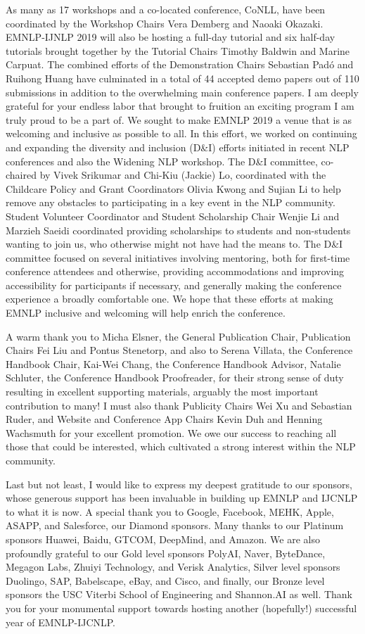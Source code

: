 As many as 17 workshops and a co-located conference, CoNLL, have been coordinated by the Workshop Chairs Vera Demberg and Naoaki Okazaki. EMNLP-IJNLP 2019 will also be hosting a full-day tutorial and six half-day tutorials brought together by the Tutorial Chairs Timothy Baldwin and Marine Carpuat. The combined efforts of the Demonstration Chairs Sebastian Padó and Ruihong Huang have culminated in a total of 44 accepted demo papers out of 110 submissions in addition to the overwhelming main conference papers. I am deeply grateful for your endless labor that brought to fruition an exciting program I am truly proud to be a part of. 
We sought to make EMNLP 2019 a venue that is as welcoming and inclusive as possible to all. In this effort, we worked on continuing and expanding the diversity and inclusion (D\&I) efforts initiated in recent NLP conferences and also the Widening NLP workshop.  The D\&I committee, co-chaired by Vivek Srikumar and Chi-Kiu (Jackie) Lo, coordinated with the Childcare Policy and Grant Coordinators Olivia Kwong and Sujian Li to help remove any obstacles to participating in a key event in the NLP community. Student Volunteer Coordinator and Student Scholarship Chair Wenjie Li and Marzieh Saeidi coordinated providing scholarships to students and non-students wanting to join us, who otherwise might not have had the means to. The D\&I committee focused on several initiatives involving mentoring, both for first-time conference attendees and otherwise, providing accommodations and improving accessibility for participants if necessary, and generally making the conference experience a broadly comfortable one. We hope that these efforts at making EMNLP inclusive and welcoming will help enrich the conference.

A warm thank you to Micha Elsner, the General Publication Chair, Publication Chairs Fei Liu and Pontus Stenetorp, and also to Serena Villata, the Conference Handbook Chair, Kai-Wei Chang, the Conference Handbook Advisor, Natalie Schluter, the Conference Handbook Proofreader, for their strong sense of duty resulting in excellent supporting materials, arguably the most important contribution to many! I must also thank Publicity Chairs Wei Xu and Sebastian Ruder, and Website and Conference App Chairs Kevin Duh and Henning Wachsmuth for your excellent promotion. We owe our success to reaching all those that could be interested, which cultivated a strong interest within the NLP community.

Last but not least, I would like to express my deepest gratitude to our sponsors, whose generous support has been invaluable in building up EMNLP and IJCNLP to what it is now. A special thank you to Google, Facebook, MEHK, Apple, ASAPP, and Salesforce, our Diamond sponsors. Many thanks to our Platinum sponsors Huawei, Baidu, GTCOM, DeepMind, and Amazon. We are also profoundly grateful to our Gold level sponsors PolyAI, Naver, ByteDance, Megagon Labs, Zhuiyi Technology, and Verisk Analytics, Silver level sponsors Duolingo, SAP, Babelscape, eBay, and Cisco, and finally, our Bronze level sponsors the USC Viterbi School of Engineering and Shannon.AI as well. 
Thank you for your monumental support towards hosting another (hopefully!) successful year of EMNLP-IJCNLP. 
 
